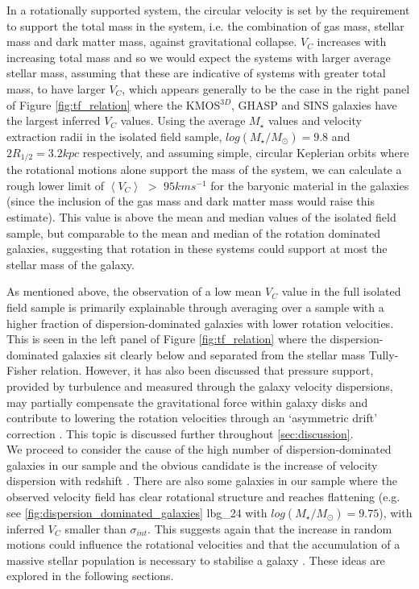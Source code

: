 \documentclass[fleqn,usenatbib]{mnras}
\begin{document}
In a rotationally supported system, the circular velocity is set by the requirement to support the total mass in the system, i.e. the combination of gas mass, stellar mass and dark matter mass, against gravitational collapse.
$V_{C}$ increases with increasing total mass and so we would expect the systems with larger average stellar mass, assuming that these are indicative of systems with greater total mass, to have larger $V_{C}$, which appears generally to be the case in the right panel of Figure \ref{fig:tf_relation} where the KMOS$^{3D}$, GHASP and SINS galaxies have the largest inferred $V_{C}$ values.
Using the average $M_{\star}$ values and velocity extraction radii in the isolated field sample, $log(M_{\star}/M_{\odot})=9.8$ and $2R_{1/2} = 3.2kpc$ respectively, and assuming simple, circular Keplerian orbits where the rotational motions alone support the mass of the system, we can calculate a rough lower limit of $\left<V_{C}\right>$ $>$ $95kms^{-1}$ for the baryonic material in the galaxies (since the inclusion of the gas mass and dark matter mass would raise this estimate).
This value is above the mean and median values of the isolated field sample, but comparable to the mean and median of the rotation dominated galaxies, suggesting that rotation in these systems could support at most the stellar mass of the galaxy.  

As mentioned above, the observation of a low mean $V_{C}$ value in the full isolated field sample is primarily explainable through averaging over a sample with a higher fraction of dispersion-dominated galaxies with lower rotation velocities.
This is seen in the left panel of Figure \ref{fig:tf_relation} where the dispersion-dominated galaxies sit clearly below and separated from the stellar mass Tully-Fisher relation.
However, it has also been discussed that pressure support, provided by turbulence and measured through the galaxy velocity dispersions, may partially compensate the gravitational force within galaxy disks and contribute to lowering the rotation velocities through an `asymmetric drift' correction \citep[e.g.][]{Burkert2010,Newman2013,Genzel2017}.
This topic is discussed further throughout \cref{sec:discussion}. \\

We proceed to consider the cause of the high number of dispersion-dominated galaxies in our sample and the obvious candidate is the increase of velocity dispersion with redshift \citep[e.g.][]{Genzel2006,Genzel2008,ForsterSchreiber2009,Law2009,Gnerucci2011,Epinat2012,Wisnioski2015}.
There are also some galaxies in our sample where the observed velocity field has clear rotational structure and reaches flattening (e.g. see \cref{fig:dispersion_dominated_galaxies} lbg\_24 with $log(M_{\star}/M_{\odot})=9.75$), with inferred $V_{C}$ smaller than $\sigma_{int}$.
This suggests again that the increase in random motions could influence the rotational velocities and that the accumulation of a massive stellar population is necessary to stabilise a galaxy \citep[e.g.][]{Law2009,Law2012b,Law2012c,Newman2013,Wisnioski2015}.
These ideas are explored in the following sections.
\end{document}
